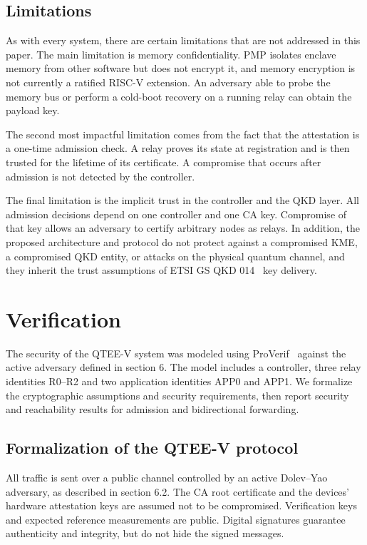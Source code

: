 \documentclass[futureinternet,article,submit,moreauthors]{Definitions/mdpi}
\begin{document}
\subsection{Limitations}

As with every system, there are certain limitations that are not addressed in this paper. The main limitation is memory confidentiality. PMP isolates enclave memory from other software but does not encrypt it, and memory encryption is not currently a ratified RISC-V extension. An adversary able to probe the memory bus or perform a cold-boot recovery on a running relay can obtain the payload key.

The second most impactful limitation comes from the fact that the attestation is a one-time admission check. A relay proves its state at registration and is then trusted for the lifetime of its certificate. A compromise that occurs after admission is not detected by the controller.

The final limitation is the implicit trust in the controller and the QKD layer. All admission decisions depend on one controller and one CA key. Compromise of that key allows an adversary to certify arbitrary nodes as relays. In addition, the proposed architecture and protocol do not protect against a compromised KME, a compromised QKD entity, or attacks on the physical quantum channel, and they inherit the trust assumptions of ETSI GS QKD 014~\cite{noauthor_quantum_2019} key delivery.

\section{Verification}

The security of the QTEE-V system was modeled using ProVerif~\cite{blanchet_modeling_2016} against the active adversary defined in section 6. The model includes a controller, three relay identities R0--R2 and two application identities APP0 and APP1. We formalize the cryptographic assumptions and security requirements, then report security and reachability results for admission and bidirectional forwarding.

\subsection{Formalization of the QTEE-V protocol}

All traffic is sent over a public channel controlled by an active Dolev--Yao~\cite{dolev_security_1983} adversary, as described in section 6.2. The CA root certificate and the devices' hardware attestation keys are assumed not to be compromised. Verification keys and expected reference measurements are public. Digital signatures guarantee authenticity and integrity, but do not hide the signed messages.
\end{document}
